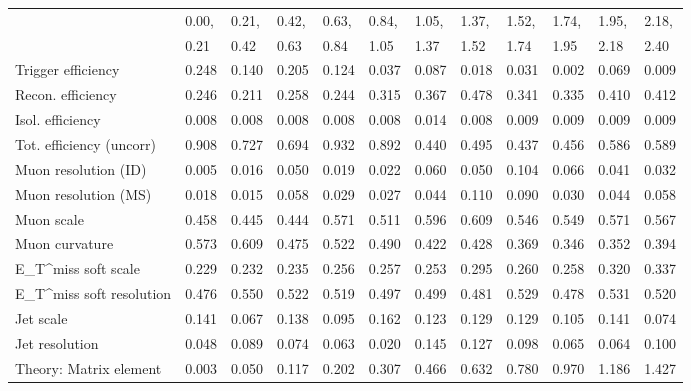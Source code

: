 \begin{tabular}{l|p{0.6cm}p{0.6cm}p{0.6cm}p{0.6cm}p{0.6cm}p{0.6cm}p{0.6cm}p{0.6cm}p{0.6cm}p{0.6cm}p{0.6cm}}
\hline
   & 0.00, & 0.21, & 0.42, & 0.63, & 0.84, & 1.05, & 1.37, & 1.52, & 1.74, & 1.95, & 2.18,  \\ 
   & 0.21 & 0.42 & 0.63 & 0.84 & 1.05 & 1.37 & 1.52 & 1.74 & 1.95 & 2.18 & 2.40  \\ 
\hline
Trigger efficiency                       & 0.248 & 0.140 & 0.205 & 0.124 & 0.037 & 0.087 & 0.018 & 0.031 & 0.002 & 0.069 & 0.009 \\
Recon. efficiency                        & 0.246 & 0.211 & 0.258 & 0.244 & 0.315 & 0.367 & 0.478 & 0.341 & 0.335 & 0.410 & 0.412 \\
Isol. efficiency                         & 0.008 & 0.008 & 0.008 & 0.008 & 0.008 & 0.014 & 0.008 & 0.009 & 0.009 & 0.009 & 0.009 \\
Tot. efficiency (uncorr)                 & 0.908 & 0.727 & 0.694 & 0.932 & 0.892 & 0.440 & 0.495 & 0.437 & 0.456 & 0.586 & 0.589 \\
Muon resolution (ID)                     & 0.005 & 0.016 & 0.050 & 0.019 & 0.022 & 0.060 & 0.050 & 0.104 & 0.066 & 0.041 & 0.032 \\
Muon resolution (MS)                     & 0.018 & 0.015 & 0.058 & 0.029 & 0.027 & 0.044 & 0.110 & 0.090 & 0.030 & 0.044 & 0.058 \\
Muon scale                               & 0.458 & 0.445 & 0.444 & 0.571 & 0.511 & 0.596 & 0.609 & 0.546 & 0.549 & 0.571 & 0.567 \\
Muon curvature                           & 0.573 & 0.609 & 0.475 & 0.522 & 0.490 & 0.422 & 0.428 & 0.369 & 0.346 & 0.352 & 0.394 \\
E_{T}^{miss} soft scale                  & 0.229 & 0.232 & 0.235 & 0.256 & 0.257 & 0.253 & 0.295 & 0.260 & 0.258 & 0.320 & 0.337 \\
E_{T}^{miss} soft resolution             & 0.476 & 0.550 & 0.522 & 0.519 & 0.497 & 0.499 & 0.481 & 0.529 & 0.478 & 0.531 & 0.520 \\
Jet scale                                & 0.141 & 0.067 & 0.138 & 0.095 & 0.162 & 0.123 & 0.129 & 0.129 & 0.105 & 0.141 & 0.074 \\
Jet resolution                           & 0.048 & 0.089 & 0.074 & 0.063 & 0.020 & 0.145 & 0.127 & 0.098 & 0.065 & 0.064 & 0.100 \\
Theory: Matrix element                   & 0.003 & 0.050 & 0.117 & 0.202 & 0.307 & 0.466 & 0.632 & 0.780 & 0.970 & 1.186 & 1.427 \\

\end{tabular}
